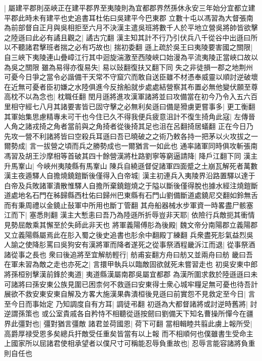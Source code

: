 |{
	屬建平郡則巫峽正在建平郡界至夷陵則為宜都郡界然孫休永安三年始分宜都立建平郡此時未有建平也史追書耳杜佑曰吳建平今巴東郡}
立數十屯以馮習為大督張南為前部督自正月與吳相拒至六月不決漢主遣吳班將數千人於平地立營吳將帥皆欲擊之陸遜曰此必有譎且觀之|{
	譎古宂翻}
漢主知其計不行乃引伏兵八千從谷中出遜曰所以不聽諸君擊班者揣之必有巧故也|{
	揣初委翻}
遜上疏於吳王曰夷陵要害國之關限|{
	自三峽下夷陵連山疊嶂江行其中迴旋湍激至西陵峽口始漫為平流夷陵正當峽口故以為吳之關限}
雖為易得亦復易失|{
	易以䜴翻復扶又翻下同}
失之非徒損一郡之地荆州可憂今日爭之當令必諧備干天常不守窟穴而敢自送臣雖不材憑奉威靈以順討逆破壞在近無可憂者臣初嫌之水陸俱進今反捨船就步處處結營察其布置必無他變伏願至尊高枕不以為念也|{
	枕職任翻}
閏月遜將進攻漢軍諸將並曰攻備當在初今乃令入五六百里相守經七八月其諸要害皆已固守擊之必無利矣遜曰備是猾虜更嘗事多|{
	更工衡翻}
其軍始集思慮精專未可干也今住已久不得我便兵疲意沮計不復生掎角此寇|{
	左傳晉人角之諸戎掎之角者當前與之角掎者從後掎其足也沮在呂翻掎居蟻翻}
正在今日乃先攻一營不利諸將皆曰空殺兵耳遜曰吾已曉破之之術乃敕各持一把茅以火攻拔之一爾勢成|{
	言一拔營之頃而兵之勝勢成也一爾猶言一如此也}
通率諸軍同時俱攻斬張南馮習及胡王沙摩相等首破其四十餘營漢將杜路劉寧等窮逼請降|{
	降戶江翻下同}
漢主升馬鞌山|{
	今峽州夷陵縣有馬鞌山}
陳兵自繞遜督促諸軍四面蹙之土崩瓦解死者萬數漢主夜遁驛人自擔燒鐃鎧斷後僅得入白帝城|{
	漢主初連兵入夷陵界沿路置驛以達于白帝及兵敗諸軍潰散惟驛人自擔所棄鐃鎧燒之于隘以斷後僅得脫也據水經注燒鎧斷道處地名石門在秭歸縣西杜佑曰歸州巴東縣有石門山劉備斷道處鐃尼交翻如鈴無舌而有秉周禮以金鐃止鼔軍中所用也斷丁管翻}
其舟船器械水步軍資一時畧盡尸骸塞江而下|{
	塞悉則翻}
漢主大慙恚曰吾乃為陸遜所折辱豈非天耶|{
	依險行兵敵扼其衝情見勢屈敵乘其懈至於失師此非天也}
將軍義陽傅肜為後殿|{
	魏文帝分南陽郡立義陽郡又立義陽縣屬焉此在肜入蜀之後史追書也肜余中翻殿丁練翻}
兵衆盡死肜氣益烈吳人諭之使降肜罵曰吳狗安有漢將軍而降者遂死之從事祭酒程畿泝江而退|{
	從事祭酒諸從事之長也}
衆曰後追將至宜解舫輕行|{
	舫甫妄翻方舟曰舫又並兩舟曰舫}
畿曰吾在軍未習為敵之走也亦死之|{
	言擐甲執兵以臨敵固欲就死未嘗習走也}
初吳安東中郎將孫桓别擊漢前鋒於夷道|{
	夷道縣漢屬南郡吳屬宜都郡}
為漢所圍求救於陸遜遜曰未可諸將曰孫安東公族見圍已困柰何不救遜曰安東得士衆心城牢糧足無可憂也待吾計展欲不救安東安東自解及方畧大施漢果犇潰桓後見遜曰前實怨不見救定至今日|{
	言至今日而事始定}
乃知調度自有方耳|{
	調徒弔翻}
初遜為大都督諸將或討逆時舊將|{
	討逆謂孫策也}
或公室貴戚各自矜恃不相聽從遜按劒曰劉備天下知名曹操所憚今在疆界此彊對也|{
	彊對猶言彊敵}
諸君並荷國恩|{
	荷下可翻}
當相輯睦共翦此虜上報所受|{
	高爵厚禄受恩多矣總兵扞敵受任重矣皆當有以上報}
而不相順何也僕雖書生受命主上國家所以屈諸君使相承望者以僕尺寸可稱能忍辱負重故也|{
	忍辱言能容諸將負重則自任也}
